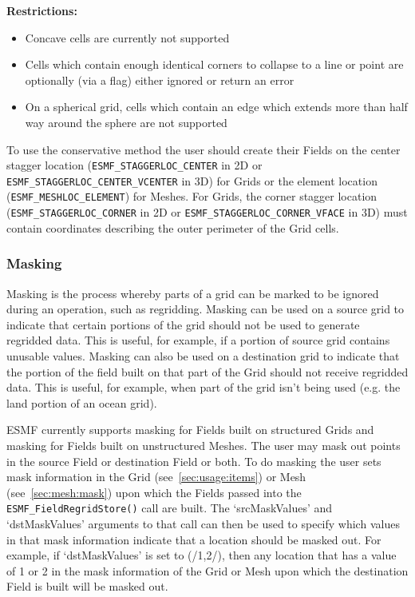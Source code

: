 \smallskip

{\bf Restrictions:}
 \begin{itemize}
 \item Concave cells are currently not supported
 \item Cells which contain enough identical corners to collapse to a line or point are optionally (via a flag) either ignored or return an error
 \item On a spherical grid, cells which contain an edge which extends more than half way around the sphere are not supported 
 \end{itemize}

\smallskip

 To use the conservative method the user should create their Fields on the center 
 stagger location ({\tt ESMF\_STAGGERLOC\_CENTER} in 2D or {\tt ESMF\_STAGGERLOC\_CENTER\_VCENTER} in 3D) for Grids  or the element location ({\tt ESMF\_MESHLOC\_ELEMENT}) for Meshes.
 For Grids, the corner stagger location ({\tt ESMF\_STAGGERLOC\_CORNER} in 2D or {\tt ESMF\_STAGGERLOC\_CORNER\_VFACE} in 3D) must contain coordinates describing the outer perimeter of the Grid cells. 

\subsubsection{Masking}
 Masking is the process whereby parts of a grid can be marked to be ignored during an operation, such as regridding. Masking can be used on a source grid to 
 indicate that certain portions of the grid should not be used to generate regridded data. This is useful, for example, if a portion of source grid contains 
 unusable values. Masking can also be used on a destination grid to indicate that the portion of the field built on that part of the Grid should not receive 
 regridded data. This is useful, for example, when part of the grid isn't being used (e.g. the land portion of an ocean grid).

 ESMF currently supports masking for Fields built on structured Grids and masking for Fields built on unstructured Meshes. The user may mask out points 
 in the source Field or destination Field or both. To do masking the user sets mask information in the Grid (see~\ref{sec:usage:items}) or 
 Mesh (see~\ref{sec:mesh:mask}) upon which the Fields passed into the 
 {\tt ESMF\_FieldRegridStore()} call are built. The `srcMaskValues' and `dstMaskValues' arguments to that call can then be used to specify which values in that mask 
 information indicate that a location should be masked out. For example, if `dstMaskValues' is set to (/1,2/), then any location that has a value of 1 or 2 in 
 the mask information of the Grid or Mesh upon which the destination Field is built will be masked out.

